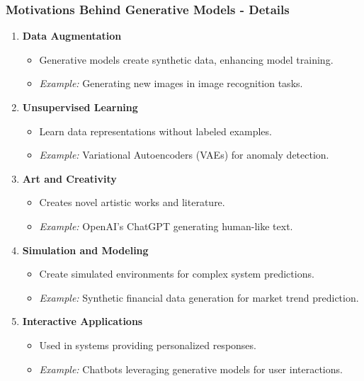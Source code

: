 \documentclass[aspectratio=169]{beamer}
\begin{document}
\begin{frame}[fragile]
    \frametitle{Motivations Behind Generative Models - Details}
    \begin{enumerate}
        \item \textbf{Data Augmentation}
            \begin{itemize}
                \item Generative models create synthetic data, enhancing model training.
                \item \textit{Example:} Generating new images in image recognition tasks.
            \end{itemize}
        
        \item \textbf{Unsupervised Learning}
            \begin{itemize}
                \item Learn data representations without labeled examples.
                \item \textit{Example:} Variational Autoencoders (VAEs) for anomaly detection.
            \end{itemize}

        \item \textbf{Art and Creativity}
            \begin{itemize}
                \item Creates novel artistic works and literature.
                \item \textit{Example:} OpenAI's ChatGPT generating human-like text.
            \end{itemize}

        \item \textbf{Simulation and Modeling}
            \begin{itemize}
                \item Create simulated environments for complex system predictions.
                \item \textit{Example:} Synthetic financial data generation for market trend prediction.
            \end{itemize}

        \item \textbf{Interactive Applications}
            \begin{itemize}
                \item Used in systems providing personalized responses.
                \item \textit{Example:} Chatbots leveraging generative models for user interactions.
            \end{itemize}
    \end{enumerate}
\end{frame}
\end{document}
